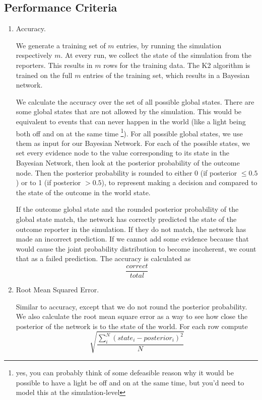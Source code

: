 \subsection{Performance Criteria}
\begin{enumerate}
\item Accuracy.

We generate a training set of $m$ entries, by running the simulation respectively $m$. At every run, we collect the state of the simulation from the reporters. This results in $m$ rows for the training data. The K2 algorithm is trained on the full $m$ entries of the training set, which results in a Bayesian network. 

We calculate the accuracy over the set of all possible global states. There are some global states that are not allowed by the simulation. This would be equivalent to events that can never happen in the world (like a light being both off and on at the same time \footnote{yes, you can probably think of some defeasible reason why it would be possible to have a light be off and on at the same time, but you'd need to model this at the simulation-level}). For all possible global states, we use them as input for our Bayesian Network. For each of the possible states, we set every evidence node to the value corresponding to its state in the Bayesian Network, then look at the posterior probability of the outcome node. Then the posterior probability is rounded to either 0 (if posterior $\leq 0.5$) or to 1 (if posterior $>0.5$), to represent making a decision and compared to the state of the outcome in the world state. 

If the outcome global state and the rounded posterior probability of the global state match, the network has correctly predicted the state of the outcome reporter in the simulation. If they do not match, the network has made an incorrect prediction. If we cannot add some evidence because that would cause the joint probability distribution to become incoherent, we count that as a failed prediction. The accuracy is calculated as \[\frac{correct}{total}\]


\item Root Mean Squared Error.

Similar to accuracy, except that we do not round the posterior probability. We also calculate the root mean square error as a way to see how close the posterior of the network is to the state of the world. For each row compute \[\sqrt{\frac{\sum_i^N (state_i - posterior_i)^2}{N}}\] 


\end{enumerate}
